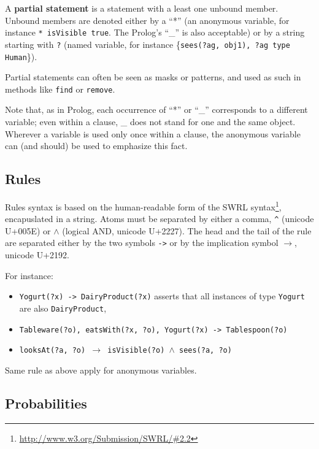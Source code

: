 A \textbf{partial statement} is a statement with a least one unbound member.
Unbound members are denoted either by a ``*'' (an anonymous variable, for
instance \texttt{* isVisible true}. The Prolog's ``\_'' is also acceptable) or by
a string starting with \texttt{?} (named variable, for instance
\{\texttt{sees(?ag, obj1), ?ag type Human}\}).

Partial statements can often be seen as masks or patterns, and used as such in
methods like \texttt{find} or \texttt{remove}.

Note that, as in Prolog, each occurrence of ``*'' or ``\_'' corresponds to a
different variable; even within a clause, \_ does not stand for one and the same
object. Wherever a variable is used only once within a clause, the anonymous
variable can (and should) be used to emphasize this fact.

\subsection{Rules}

Rules syntax is based on the human-readable form of the SWRL
syntax\footnote{\url{http://www.w3.org/Submission/SWRL/\#2.2}}, encapuslated
in a string. Atoms must be separated by either a comma, \texttt{\^{ }} (unicode
U+005E) or \texttt{{$\land$}} (logical AND, unicode U+2227). The head and the 
tail of the rule are separated either by the two symbols \texttt{->} or by the
implication symbol \texttt{$\to$}, unicode U+2192.

For instance:

\begin{itemize}

    \item {\tt Yogurt(?x) -> DairyProduct(?x)} asserts that all instances of type
    {\tt Yogurt} are also {\tt DairyProduct},

    \item {\tt Tableware(?o), eatsWith(?x, ?o), Yogurt(?x) -> Tablespoon(?o)}

    \item {\tt looksAt(?a, ?o) $\to$ isVisible(?o) $\land$ sees(?a, ?o)}

\end{itemize}

Same rule as above apply for anonymous variables.

\subsection{Probabilities}

